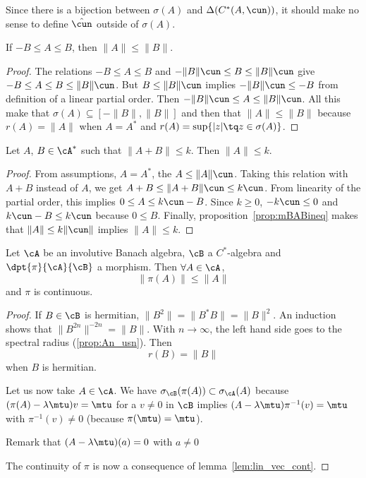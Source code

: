 Since there is a bijection between $\sigma(A)$ and $\Delta(C^*(A,\cun))$, it should make no sense to define $\hat\cun$ outside of $\sigma(A)$.

\begin{proposition} \label{prop:mBABineq}
	If $-B\leq A\leq B$, then $\| A \|\leq\| B \|$.
\end{proposition}

\begin{proof}
	The relations $-B\leq A\leq B$ and $-\| B \|\cun\leq B\leq\| B \|\cun$ give $-B\leq A\leq B\leq\| B \|\cun$. But $B\leq\| B \|\cun$ implies $-\| B \|\cun\leq-B$ from definition of a linear partial order. Then $-\| B \|\cun\leq A\leq\| B \|\cun$. All this make that $\sigma(A)\subseteq[-\| B \|,\| B \|]$ and then that $\| A \|\leq\| B \|$ because $r(A)=\| A \|$ when $A=A^*$ and $r(A)=\sup\{ | z |\tq z\in\sigma(A) \}$.
\end{proof}

\begin{proposition}
	Let $A$, $B\in\cA^*$ such that $\| A+B \|\leq k$. Then $\| A \|\leq k$.
\end{proposition}

\begin{proof}
	From assumptions, $A=A^*$, the $A\leq\| A \|\cun$. Taking this relation with $A+B$ instead of $A$, we get $A+B\leq\| A+B \|\cun\leq k\cun$. From linearity of the partial order, this implies $0\leq A\leq k\cun -B$. Since $k\geq 0$, $-k\cun\leq 0$ and $k\cun-B\leq k\cun$ because $0\leq B$. Finally, proposition~\ref{prop:mBABineq}  makes that $\| A \|\leq k\| \cun \|$ implies $\| A \|\leq k$.
\end{proof}

\begin{proposition} \label{PropMDfqcUs}
	Let $\cA$ be an involutive Banach algebra, $\cB$ a $C^{*}$-algebra and $\dpt{\pi}{\cA}{\cB}$ a morphism. Then $\forall A\in\cA$,
	\begin{equation}  \label{eq_morleqpi}
		\|\pi(A)\|\leq\|A\|
	\end{equation}
	and \( \pi\) is continuous.
\end{proposition}

\begin{proof}
	If $B\in\cB$ is hermitian, $\|B^2\|=\|B^*B\|=\|B\|^2$. An induction shows that $\|B^{2n}\|^{-2n}=\|B\|$. With $n\to\infty$, the left hand side goes to the spectral radius (\ref{prop:An_usn}). Then
	\begin{equation}
		r(B)=\|B\|
	\end{equation}
	when $B$ is hermitian.

	Let us now take $A\in\cA$. We have $\sigma_{\cB}(\pi(A))\subset \sigma_{\cA}(A)$ because $(\pi(A)-\lambda\mtu)v=\mtu$ for a $v\neq 0$ in $\cB$ implies $(A-\lambda\mtu)\pi^{-1}(v)=\mtu$ with $\pi^{-1}(v)\neq 0$ (because $\pi(\mtu)=\mtu$).

	Remark that $(A-\lambda\mtu)(a)=0$ with $a\neq 0$

	The continuity of \( \pi\) is now a consequence of lemma~\ref{lem:lin_vec_cont}.
\end{proof}


